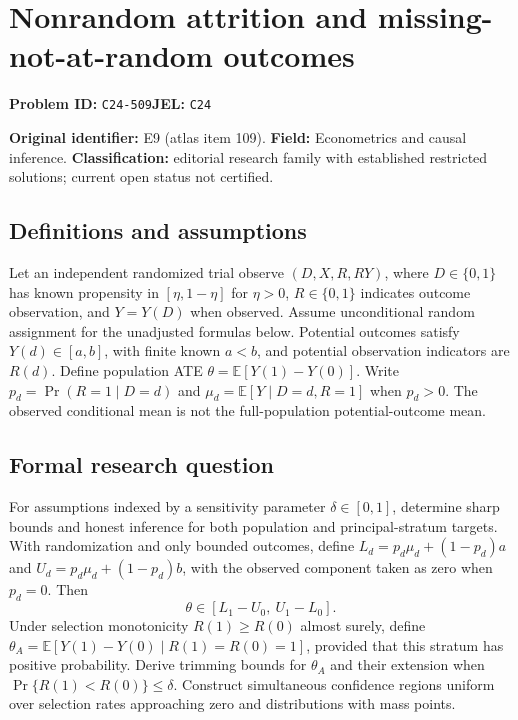 \documentclass[11pt,a4paper]{article}
\begin{document}
\section*{Nonrandom attrition and missing-not-at-random outcomes}
\textbf{Problem ID:} \texttt{C24-509}\quad \textbf{JEL:} \texttt{C24}\par
\label{problem:OP-0109}
\label{atlas:prob:E9}

\noindent\textbf{Original identifier:} E9 (atlas item 109). \textbf{Field:} Econometrics and causal inference. \textbf{Classification:} editorial research family with established restricted solutions; current open status not certified.

\subsection*{Definitions and assumptions}

Let an independent randomized trial observe $(D,X,R,RY)$, where $D\in\{0,1\}$ has known propensity in $[\eta,1-\eta]$ for $\eta>0$, $R\in\{0,1\}$ indicates outcome observation, and $Y=Y(D)$ when observed. Assume unconditional random assignment for the unadjusted formulas below. Potential outcomes satisfy $Y(d)\in[a,b]$, with finite known $a<b$, and potential observation indicators are $R(d)$. Define population ATE $\theta=\mathbb E[Y(1)-Y(0)]$. Write $p_d=\Pr(R=1\mid D=d)$ and $\mu_d=\mathbb E[Y\mid D=d,R=1]$ when $p_d>0$. The observed conditional mean is not the full-population potential-outcome mean.

\subsection*{Formal research question}

For assumptions indexed by a sensitivity parameter $\delta\in[0,1]$, determine sharp bounds and honest inference for both population and principal-stratum targets. With randomization and only bounded outcomes, define $L_d=p_d\mu_d+(1-p_d)a$ and $U_d=p_d\mu_d+(1-p_d)b$, with the observed component taken as zero when $p_d=0$. Then
\[
\theta\in[L_1-U_0,\ U_1-L_0].
\]
Under selection monotonicity $R(1)\ge R(0)$ almost surely, define $\theta_A=\mathbb E[Y(1)-Y(0)\mid R(1)=R(0)=1]$, provided that this stratum has positive probability. Derive trimming bounds for $\theta_A$ and their extension when $\Pr\{R(1)<R(0)\}\le\delta$. Construct simultaneous confidence regions uniform over selection rates approaching zero and distributions with mass points.
\end{document}
